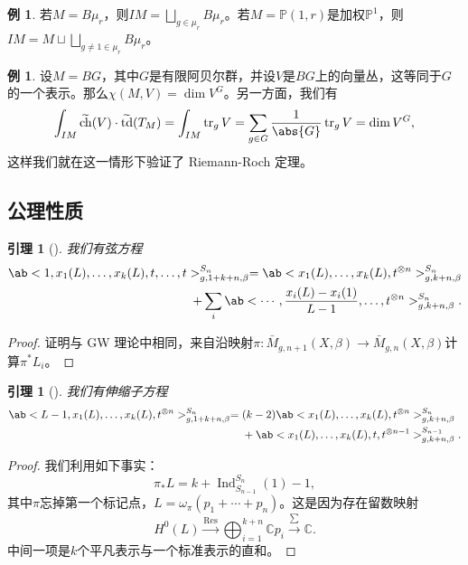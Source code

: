 \documentclass{amsart}
\newtheorem{lem}[thm]{引理}
\theoremstyle{definition}
\newtheorem{exm}[thm]{例}
\theoremstyle{remark}
\theoremstyle{plain}
\theoremstyle{definition}
\theoremstyle{remark}
\newcommand{\C}{\mathbb{C}}
\renewcommand{\P}{\mathbb{P}}
\newcommand{\on}[1]{\operatorname{#1}}
\newcommand{\wt}[1]{\widetilde{#1}}
\newcommand{\1}{\mathbf{1}}
\newcommand{\2}{\mathbf{2}}
\newcommand{\3}{\mathbf{3}}
\begin{document}
\begin{exm}
    若\(M = B\mu_r\)，则\(IM = \bigsqcup_{g \in \mu_r} B \mu_r\)。若\(M = \P(1, r)\)是加权\(\P^1\)，则\(IM = M \sqcup \bigsqcup_{g \neq 1 \in \mu_r} B\mu_r\)。
\end{exm}

\begin{exm}
    设\(M = BG\)，其中\(G\)是有限阿贝尔群，并设\(V\)是\(BG\)上的向量丛，这等同于\(G\)的一个表示。那么\(\chi(M, V) = \dim V^G\)。另一方面，我们有
    \[ \int_{IM} \wt{\on{ch}}(V) \cdot \wt{\on{td}}(T_M) = \int_{IM} \on{tr}_g V = \sum_{g \in G} \frac{1}{\abs{G}} \on{tr}_g V = \dim V^G, \]
    这样我们就在这一情形下验证了 Riemann-Roch 定理。
\end{exm}

\subsection{公理性质}%
\label{sub:Axiomatic properties}

\begin{lem}[{\cite{GiventalK7}}]
    我们有\textit{弦方程}
    \begin{align*}
        \ab< 1, x_1(L), \ldots, x_k(L), t, \ldots, t >_{g, 1+k+n, \beta}^{S_n} = \ab<x_1(L), \ldots, x_k(L), t^{\otimes n}>^{S_n}_{g,k+n,\beta} \\
        + \sum_i \ab< \cdots, \frac{x_i(L) - x_i(1)}{L-1}, \ldots, t^{\otimes n}>^{S_n}_{g,k+n,\beta}. 
    \end{align*}
\end{lem}

\begin{proof}
    证明与 GW 理论中相同，来自沿映射\(\pi \colon\bar{M}_{g,n+1}(X,\beta) \to \bar{M}_{g,n}(X,\beta)\)计算\(\pi^* L_i\)。
\end{proof}

\begin{lem}[{\cite{GiventalK7}}]
    我们有\textit{伸缩子方程}
    \begin{align*}
        \ab<L-1, x_1(L), \ldots, x_k(L), t^{\otimes n}>_{g,1+k+n,\beta}^{S_n} ={}& (k-2)\ab<x_1(L), \ldots, x_k(L), t^{\otimes n}>_{g,k+n,\beta}^{S_n} \\
        &+ \ab<x_1(L), \ldots, x_k(L), t, t^{\otimes n-1}>_{g,k+n,\beta}^{S_{n-1}}.
    \end{align*}
\end{lem}

\begin{proof}
    我们利用如下事实：
    \[ \pi_* L = k + \on{Ind}_{S_{n-1}}^{S_n}(1) - 1, \]
    其中\(\pi\)忘掉第一个标记点，\(L = \omega_{\pi} (p_1 + \cdots + p_n)\)。这是因为存在留数映射
    \[ H^0(L) \xrightarrow{\on{Res}} \bigoplus_{i=1}^{k+n} \C p_i \xrightarrow{\sum} \C. \]
    中间一项是\(k\)个平凡表示与一个标准表示的直和。
\end{proof}
\end{document}
